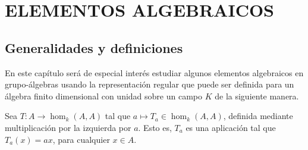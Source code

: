 \chapter{ELEMENTOS ALGEBRAICOS}

\section{\quad Generalidades y definiciones}
En este capítulo será de especial interés estudiar algunos elementos algebraicos en grupo-álgebras usando la representación regular que puede ser definida para un álgebra finito dimensional con unidad sobre un campo $K$ de la siguiente manera.

\begin{definicion}
Sea $T \colon A \to \hom_k(A,A)$ tal que $a \mapsto T_a \in \hom_k(A,A)$, definida mediante multiplicación por la izquierda por $a$. Esto es, $T_a$ es una aplicación tal que $T_a(x) = ax$, para cualquier $x \in A$.  
\end{definicion}

